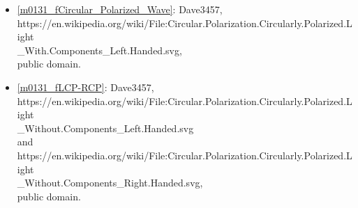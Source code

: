 \begin{itemize}
\item[Fig.] \label{m0131_Circular.Polarization.Circularly.Polarized.Light_With.Components_Left.Handed_Credit}
  \ref{m0131_fCircular_Polarized_Wave}:
  Dave3457, 
  {https://en.wikipedia.org/wiki/File:Circular.Polarization.Circularly.Polarized.Light\\\_With.Components\_Left.Handed.svg},\\ 
  public domain.

\item[Fig.] \label{m0131_Circular.Polarization.Circularly.Polarized.Light_Without.Components_Credit}
  \ref{m0131_fLCP-RCP}:
  Dave3457, 
  {https://en.wikipedia.org/wiki/File:Circular.Polarization.Circularly.Polarized.Light\\\_Without.Components\_Left.Handed.svg}\\ 
and
  {https://en.wikipedia.org/wiki/File:Circular.Polarization.Circularly.Polarized.Light\\
\_Without.Components\_Right.Handed.svg},\\ 
  public domain.

\end{itemize}

\twocolumn
